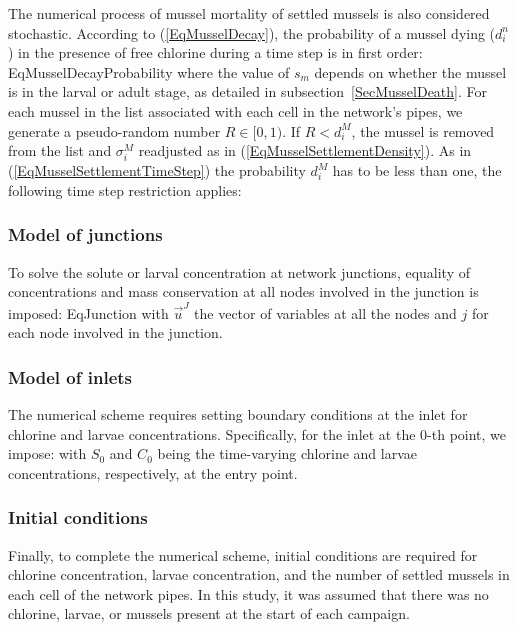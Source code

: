 \documentclass[review,authoryear]{elsarticle}
\begin{document}
The numerical process of mussel mortality of settled mussels is also considered
stochastic. According to (\ref{EqMusselDecay}), the probability of a mussel
dying ($d_i^n$) in the presence of free chlorine during a time step is in first
order:
{EqMusselDecayProbability}
where the value of $s_m$ depends on whether the mussel is in the larval or
adult stage, as detailed in subsection~\ref{SecMusselDeath}. For each mussel in
the list associated with each cell in the network's pipes, we generate a
pseudo-random number $R\in[0,1)$. If $R<d_i^M$, the mussel is removed from the
list and $\sigma_i^M$ readjusted as in (\ref{EqMusselSettlementDensity}). As in
(\ref{EqMusselSettlementTimeStep}) the probability $d_i^M$ has to be less than
one, the following time step restriction applies:

\subsubsection{Model of junctions}

To solve the solute or larval concentration at network junctions, equality of
concentrations and mass conservation at all nodes involved in the junction is
imposed:
{EqJunction}
with $\vec{u}^J$ the vector of variables at all the nodes and $j$ for each node
involved in the junction.

\subsubsection{Model of inlets}

The numerical scheme requires setting boundary conditions at the inlet for
chlorine and larvae concentrations. Specifically, for the inlet at the 0-th
point, we impose:
with $S_0$ and $C_0$ being the time-varying chlorine and larvae concentrations,
respectively, at the entry point.

\subsubsection{Initial conditions}

Finally, to complete the numerical scheme, initial conditions are required for
chlorine concentration, larvae concentration, and the number of settled mussels
in each cell of the network pipes. In this study, it was assumed that there was
no chlorine, larvae, or mussels present at the start of each campaign.
\end{document}
